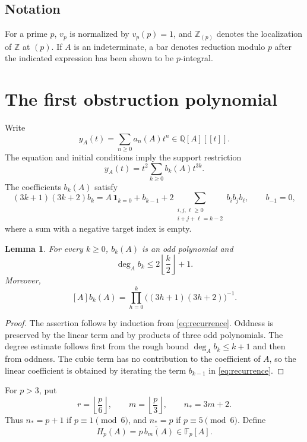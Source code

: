 \documentclass[11pt,a4paper,reqno]{amsart}
\newtheorem{lemma}[theorem]{Lemma}
\theoremstyle{definition}
\theoremstyle{remark}
\newcommand{\Q}{\mathbb Q}
\newcommand{\Z}{\mathbb Z}
\newcommand{\F}{\mathbb F}
\newcommand{\degA}{\deg_A}
\begin{document}
\subsection*{Notation}
For a prime $p$, $v_p$ is normalized by $v_p(p)=1$, and $\Z_{(p)}$ denotes the localization of $\Z$ at $(p)$. If $A$ is an indeterminate, a bar denotes reduction modulo $p$ after the indicated expression has been shown to be $p$-integral.

\section{The first obstruction polynomial}

Write
\[
 y_A(t)=\sum_{n\ge0}a_n(A)t^n\in\Q[A][[t]].
\]
The equation and initial conditions imply the support restriction
\begin{equation}\label{eq:support}
 y_A(t)=t^2\sum_{k\ge0}b_k(A)t^{3k}.
\end{equation}
The coefficients $b_k(A)$ satisfy
\begin{equation}\label{eq:recurrence}
 (3k+1)(3k+2)b_k
 =A\,\mathbf 1_{k=0}+b_{k-1}
 +2\sum_{\substack{i,j,\ell\ge0\\i+j+\ell=k-2}}b_i b_j b_\ell,
 \qquad b_{-1}=0,
\end{equation}
where a sum with a negative target index is empty.

\begin{lemma}\label{lem:degree}
For every $k\ge0$, $b_k(A)$ is an odd polynomial and
\[
 \degA b_k\le 2\left\lfloor\frac{k}{2}\right\rfloor+1.
\]
Moreover,
\[
 [A]b_k(A)=\prod_{h=0}^{k}\bigl((3h+1)(3h+2)\bigr)^{-1}.
\]
\end{lemma}

\begin{proof}
The assertion follows by induction from \eqref{eq:recurrence}. Oddness is preserved by the linear term and by products of three odd polynomials. The degree estimate follows first from the rough bound $\degA b_k\le k+1$ and then from oddness. The cubic term has no contribution to the coefficient of $A$, so the linear coefficient is obtained by iterating the term $b_{k-1}$ in \eqref{eq:recurrence}.
\end{proof}

For $p>3$, put
\[
 r=\left\lfloor\frac p6\right\rfloor,\qquad
 m=\left\lfloor\frac p3\right\rfloor,
 \qquad n_*=3m+2.
\]
Thus $n_*=p+1$ if $p\equiv1\pmod6$, and $n_*=p$ if $p\equiv5\pmod6$. Define
\begin{equation}\label{eq:Hpdef}
 H_p(A)=\overline{p\,b_m(A)}\in\F_p[A].
\end{equation}
\end{document}
